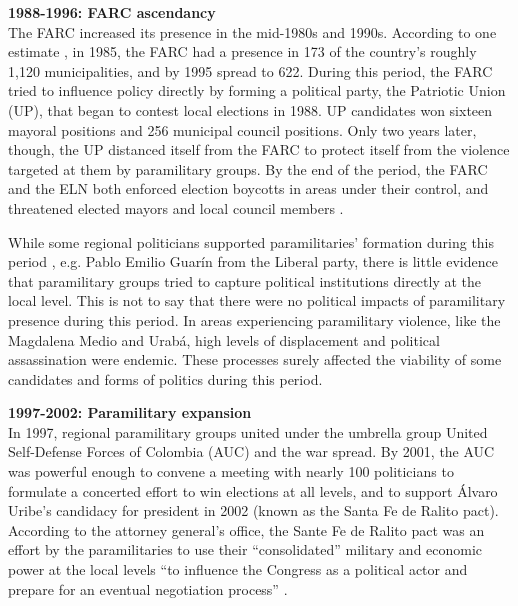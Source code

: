 \textbf{1988-1996: FARC ascendancy}\\
The FARC increased its presence in the mid-1980s and 1990s. According to one estimate \citep[28]{echandia06a}, in 1985, the FARC had a presence in 173 of the country's roughly 1,120 municipalities, and by 1995 spread to 622. During this period, the FARC tried to influence policy directly by forming a political party, the Patriotic Union (UP), that began to contest local elections in 1988.  UP candidates won sixteen mayoral positions and 256 municipal council positions. Only two years later, though, the UP distanced itself from the FARC to protect itself from the violence targeted at them by paramilitary groups. By the end of the period, the FARC and the ELN both enforced election boycotts in areas under their control, and threatened elected mayors and local council members \citep{el-tiempo97a}. 

While some regional politicians supported paramilitaries' formation during this period \citep[37]{ronderos14a}, e.g. Pablo Emilio Guar\'{i}n from the Liberal party, there is little evidence that paramilitary groups tried to capture political institutions directly at the local level. This is not to say that there were no political impacts of paramilitary presence during this period. In areas experiencing paramilitary violence, like the Magdalena Medio and Urab\'{a}, high levels of displacement and political assassination were endemic. These processes surely affected the viability of some candidates and forms of politics during this period.  

\textbf{1997-2002: Paramilitary expansion}\\
In 1997, regional paramilitary groups united under the umbrella group United Self-Defense Forces of Colombia (AUC) and the war spread. By 2001, the AUC was powerful enough to convene a meeting with nearly 100 politicians to formulate a concerted effort to win elections at all levels, and to support \'Alvaro Uribe's candidacy for president in 2002 (known as the Santa Fe de Ralito pact). According to the attorney general's office, the Sante Fe de Ralito pact was an effort by the paramilitaries to use their ``consolidated'' military and economic power at the local levels ``to influence the Congress as a political actor and prepare for an eventual negotiation process'' \citep{verdad-abierta15a}. 

